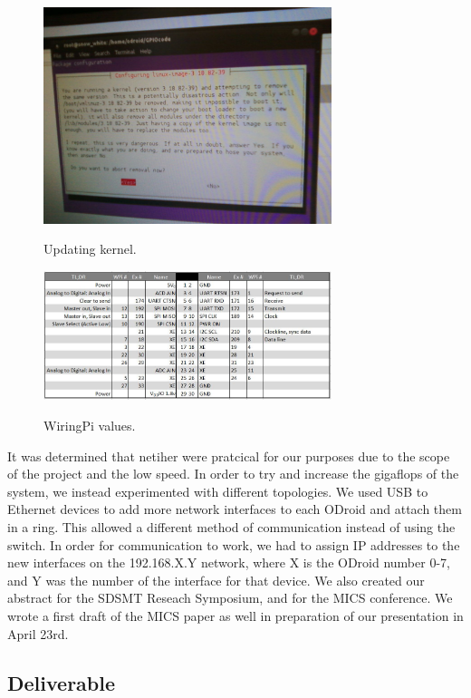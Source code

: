 \begin{figure}[tbh]
	\caption{Updating kernel.}
	\centering
		\includegraphics[width=0.75\textwidth]{PurpleScreen.jpg}
	\label{fig:purple}
\end{figure}

\begin{figure}[tbh]
	\caption{WiringPi values.}
	\centering
		\includegraphics[width=0.75\textwidth]{gpio.JPG}
	\label{fig:gpio}
\end{figure}

It was determined that netiher were pratcical for our purposes due to the scope of the project and the low speed. In order to try and increase the gigaflops of the system, we instead experimented with different topologies. We used USB to Ethernet devices to add more network interfaces to each ODroid and attach them in a ring. This allowed a different method of communication instead of using the switch. In order for communication to work, we had to assign IP addresses to the new interfaces on the 192.168.X.Y network, where X is the ODroid number 0-7, and Y was the number of the interface for that device. We also created our abstract for the SDSMT Reseach Symposium, and for the MICS conference. We wrote a first draft of the MICS paper as well in preparation of our presentation in April 23rd. 

\subsection{Deliverable}

